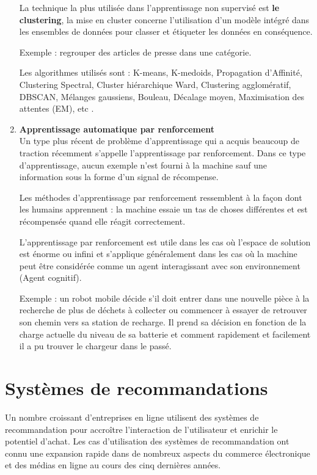\begin{enumerate}[leftmargin=0.5cm]
La technique la plus utilisée dans l'apprentissage non supervisé est \textbf{le clustering}, la mise en cluster concerne l'utilisation d'un modèle intégré dans les ensembles de données pour classer et étiqueter les données en conséquence.

Exemple : regrouper des articles de presse dans une catégorie.

Les algorithmes utilisés sont : K-means, K-medoids, Propagation d'Affinité, Clustering Spectral, Cluster hiérarchique Ward, Clustering agglomératif, DBSCAN, Mélanges gaussiens, Bouleau, Décalage moyen, Maximisation des attentes (EM), etc \cite{surveymachinelearningregression}.

\item \textbf{Apprentissage automatique par renforcement}\\
Un type plus récent de problème d'apprentissage qui a acquis beaucoup de traction récemment s'appelle l'apprentissage par renforcement. Dans ce type d'apprentissage, aucun exemple n'est fourni à la machine sauf une information sous la forme d'un signal de récompense.

Les méthodes d'apprentissage par renforcement ressemblent à la façon dont les humains apprennent : la machine essaie un tas de choses différentes et est récompensée quand elle réagit correctement.

L'apprentissage par renforcement est utile dans les cas où l'espace de solution est énorme ou infini et s'applique généralement dans les cas où la machine peut être considérée comme un agent interagissant avec son environnement (Agent cognitif).

Exemple : un robot mobile décide s'il doit entrer dans une nouvelle pièce à la recherche de plus de déchets à collecter ou commencer à essayer de retrouver son chemin vers sa station de recharge. Il prend sa décision en fonction de la charge actuelle du niveau de sa batterie et comment rapidement et facilement il a pu trouver le chargeur dans le passé.
\end{enumerate}

\section{Systèmes de recommandations}
Un nombre croissant d'entreprises en ligne utilisent des systèmes de recommandation pour accroître l'interaction de l'utilisateur et enrichir le potentiel d'achat. Les cas d'utilisation des systèmes de recommandation ont connu une expansion rapide dans de nombreux aspects du commerce électronique et des médias en ligne au cours des cinq dernières années.

